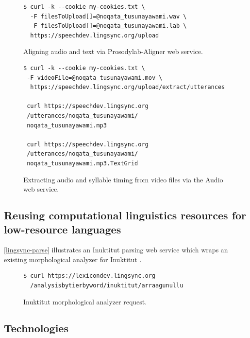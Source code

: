\documentclass[11pt]{article}
\begin{document}
\begin{figure}[h]
\scriptsize
\begin{verbatim}
$ curl -k --cookie my-cookies.txt \
  -F filesToUpload[]=@noqata_tusunayawami.wav \
  -F filesToUpload[]=@noqata_tusunayawami.lab \
  https://speechdev.lingsync.org/upload

\end{verbatim}
\normalsize
\caption{Aligning audio and text via Prosodylab-Aligner web service.}
\label{lingsync-aligner}
\end{figure}



\begin{figure}[h]
\scriptsize
\begin{verbatim}
$ curl -k --cookie my-cookies.txt \
 -F videoFile=@noqata_tusunayawami.mov \
  https://speechdev.lingsync.org/upload/extract/utterances
  
 curl https://speechdev.lingsync.org
 /utterances/noqata_tusunayawami/
 noqata_tusunayawami.mp3 
 
 curl https://speechdev.lingsync.org
 /utterances/noqata_tusunayawami/
 noqata_tusunayawami.mp3.TextGrid
\end{verbatim}
\normalsize
\caption{Extracting audio and syllable timing from video files via the Audio web service.}
\label{lingsync-video}
\end{figure}


\subsection{Reusing computational linguistics resources for low-resource languages}

\autoref{lingsync-parse} illustrates an Inuktitut parsing web service which wraps an existing
morphological analyzer for Inuktitut \cite{Farley:2012:Online}.


\begin{figure}[h]
\scriptsize
\begin{verbatim}
$ curl https://lexicondev.lingsync.org
  /analysisbytierbyword/inuktitut/arraagunullu
\end{verbatim}
\normalsize
\caption{Inuktitut morphological analyzer request.}
\label{lingsync-parse}
\end{figure}


\subsection{Technologies}
\end{document}
